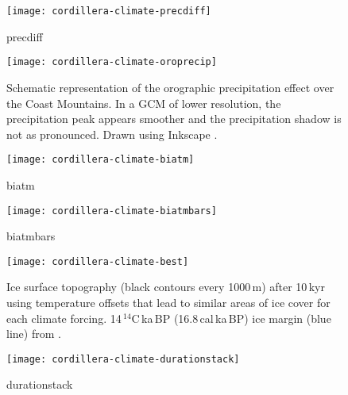 \begin{figure}[t]
	\vspace*{2mm}
	\begin{center}
		\texttt{[image: cordillera-climate-precdiff]}
	\end{center}
	\caption{precdiff}
	\label{fig:precdiff}
\end{figure}

\begin{figure}[t]
	\vspace*{2mm}
	\begin{center}
		\texttt{[image: cordillera-climate-oroprecip]}
	\end{center}
	\caption{Schematic representation of the orographic precipitation effect over the Coast Mountains. In a GCM of lower resolution, the precipitation peak appears smoother and the precipitation shadow is not as pronounced. Drawn using Inkscape \citep{web:inkscape}.}
	\label{fig:oroprecip}
\end{figure}

\begin{figure*}[t]
	\vspace*{2mm}
	\begin{center}
		\texttt{[image: cordillera-climate-biatm]}
	\end{center}
	\caption{biatm}
	\label{fig:biatm}
\end{figure*}

\begin{figure*}[t]
	\vspace*{2mm}
	\begin{center}
		\texttt{[image: cordillera-climate-biatmbars]}
	\end{center}
	\caption{biatmbars}
	\label{fig:biatmbars}
\end{figure*}

\begin{figure*}[t]
	\vspace*{2mm}
	\begin{center}
		\texttt{[image: cordillera-climate-best]}
	\end{center}
	\caption{Ice surface topography (black contours every 1000\,m) after 10\,kyr using temperature offsets that lead to similar areas of ice cover for each climate forcing. 14\,$^{14}$C\,ka\,BP (16.8\,cal\,ka\,BP) ice margin (blue line) from \citet{dyke-2004}.}
	\label{fig:best}
\end{figure*}

\begin{figure}[t]
	\vspace*{2mm}
	\begin{center}
		\texttt{[image: cordillera-climate-durationstack]}
	\end{center}
	\caption{durationstack}
	\label{fig:durationstack}
\end{figure}
